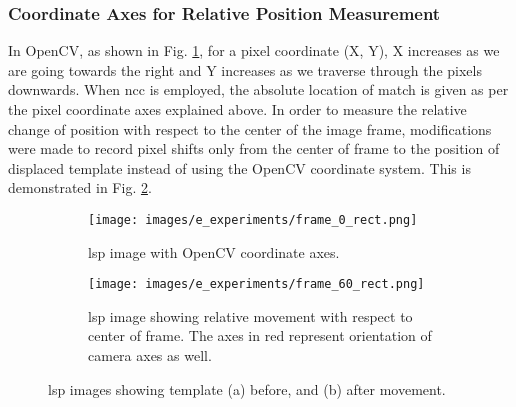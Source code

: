         
    \subsubsection*{Coordinate Axes for Relative Position Measurement}
        In OpenCV, as shown in Fig. \ref{subfig:frame_0_rect.png}, for a pixel coordinate (X, Y), X increases as we are going towards the right and Y increases as we traverse through the pixels downwards. When \gls{ncc} is employed, the absolute location of match is given as per the pixel coordinate axes explained above. In order to measure the relative change of position with respect to the center of the image frame, modifications were made to record pixel shifts only from the center of frame to the position of displaced template instead of using the OpenCV coordinate system. This is demonstrated in Fig. \ref{subfig:frame_60_rect.png}.

        \begin{figure}[ht]
            \centering
            \begin{subfigure}{0.49\textwidth}
                \texttt{[image: images/e\_experiments/frame\_0\_rect.png]}
                \caption{\gls{lsp} image with OpenCV coordinate axes.}
                \label{subfig:frame_0_rect.png}
            \end{subfigure}
            \begin{subfigure}{0.49\textwidth}
                \texttt{[image: images/e\_experiments/frame\_60\_rect.png]}
                \caption{\gls{lsp} image showing relative movement with respect to center of frame. The axes in red represent orientation of camera axes as well.}
                \label{subfig:frame_60_rect.png}
            \end{subfigure}
            \caption{\gls{lsp} images showing template (a) before, and (b) after movement.}
            \label{fig:coord_axes_frame}
        \end{figure}


